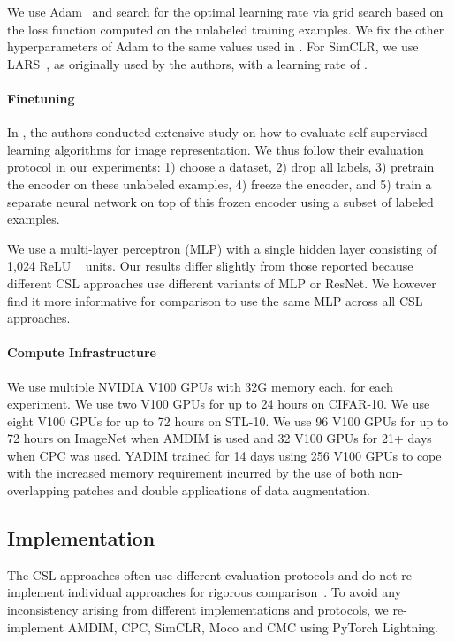 \documentclass{article}
\begin{document}
We use Adam~\cite{kingma2014adam} and search for the optimal learning rate via grid search based on the loss function computed on the unlabeled training examples. We fix the other hyperparameters of Adam to the same values used in \cite{bachman2019learning}. For SimCLR, we use LARS~\cite{you2017large}, as originally used by the authors, with a learning rate of .

\paragraph{Finetuning}
\label{section:ft_protocol}

In \cite{kolesnikov2019revisiting}, the authors conducted extensive study on how to evaluate self-supervised learning algorithms for image representation. We thus follow their evaluation protocol in our experiments: 1) choose a dataset, 2) drop all labels, 3) pretrain the encoder on these unlabeled examples, 4) freeze the encoder, and 5) train a separate neural network on top of this frozen encoder using a subset of labeled examples.


We use a multi-layer perceptron (MLP) with a single hidden layer consisting of 1,024 ReLU ~\cite{nair2010rectified} units. Our results differ slightly from those reported because different CSL approaches use different variants of MLP or ResNet.
We however find it more informative for comparison to use the same MLP across all CSL approaches.

\paragraph{Compute Infrastructure}

We use multiple NVIDIA V100 GPUs with 32G memory each, for each experiment. We use two V100 GPUs for up to 24 hours on CIFAR-10. We use eight V100 GPUs for up to 72 hours on STL-10. We use 96 V100 GPUs for up to 72 hours on ImageNet when AMDIM is used and 32 V100 GPUs for 21+ days when CPC was used. YADIM trained for 14 days using 256 V100 GPUs to cope with the increased memory requirement incurred by the use of both non-overlapping patches and double applications of data augmentation.

\subsection{Implementation}

The CSL approaches often use different evaluation protocols and do not re-implement individual approaches for rigorous comparison~\cite{henaff2019data,tian2019contrastive,hjelm2018learning,chen2020simple}. To avoid any inconsistency arising from different implementations and protocols, we re-implement AMDIM, CPC, SimCLR, Moco and CMC using PyTorch Lightning.
\end{document}
